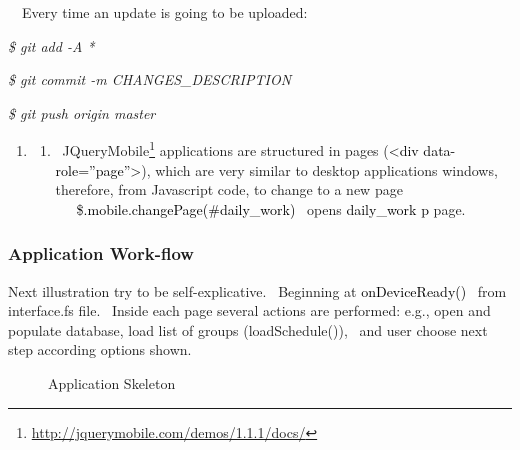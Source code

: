\documentclass[a4paper]{article}
\begin{document}
\ \ Every time an update is going to be uploaded:

{\itshape
\$ git add -A *}

{\itshape
\$ git commit -m
{\textquotesingle}CHANGES\_DESCRIPTION{\textquotesingle}}

\textit{\$ git push origin master}


\bigskip

\begin{enumerate}
\item \begin{enumerate}
\item
\ JQueryMobile\footnote{\url{http://jquerymobile.com/demos/1.1.1/docs/}}
applications are structured in pages (\textcolor{black}{{\textless}div
data-role=”page”{\textgreater}}), which are very similar to desktop
applications windows, therefore, from Javascript code, to change to a
new page
\ \textcolor{black}{\ }\textcolor{black}{\ \$.mobile.changePage({\textquotedbl}\#daily\_work{\textquotedbl})}\textcolor{black}{
}\ opens \textcolor{black}{daily\_work p} page. \ 
\end{enumerate}
\end{enumerate}
\clearpage\subsubsection[Application Work{}-flow ]{Application Work-flow
}
\hypertarget{RefHeading146521801272074}{}Next illustration try to be
self-explicative. \ Beginning at \textcolor{black}{onDeviceReady()}
\ from interface.fs file. \ Inside each page several actions are
performed: e.g., open and populate database, load list of groups
(loadSchedule()), \ and user choose next step according options shown. 

{\centering \par}

\begin{figure}
\caption[Application Skeleton]{Application Skeleton}
\label{seq:refIllustration5}

\end{figure}

\bigskip


\bigskip


\bigskip


\bigskip


\bigskip


\bigskip
\end{document}

